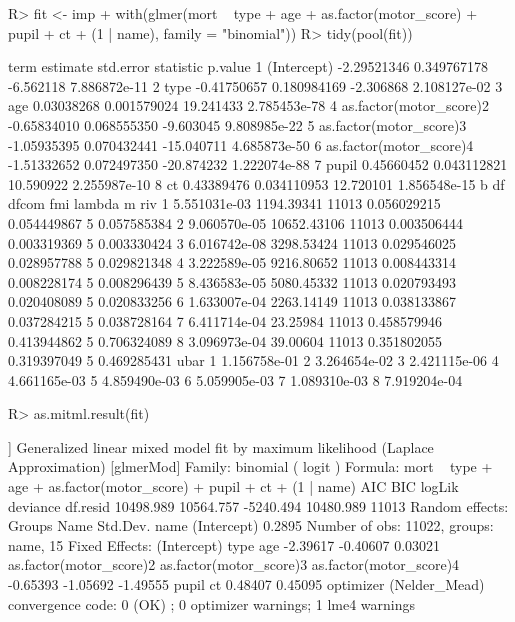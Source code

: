 \documentclass[
]{jss}
\begin{document}
\begin{CodeChunk}
\begin{CodeInput}
R> fit <- imp %
+   with(glmer(mort ~ type + age + as.factor(motor_score) + pupil + ct + (1 | name), family = "binomial")) 
R> tidy(pool(fit))
\end{CodeInput}
\begin{CodeOutput}
                     term    estimate   std.error  statistic      p.value
1             (Intercept) -2.29521346 0.349767178  -6.562118 7.886872e-11
2                    type -0.41750657 0.180984169  -2.306868 2.108127e-02
3                     age  0.03038268 0.001579024  19.241433 2.785453e-78
4 as.factor(motor_score)2 -0.65834010 0.068555350  -9.603045 9.808985e-22
5 as.factor(motor_score)3 -1.05935395 0.070432441 -15.040711 4.685873e-50
6 as.factor(motor_score)4 -1.51332652 0.072497350 -20.874232 1.222074e-88
7                   pupil  0.45660452 0.043112821  10.590922 2.255987e-10
8                      ct  0.43389476 0.034110953  12.720101 1.856548e-15
             b          df dfcom         fmi      lambda m         riv
1 5.551031e-03  1194.39341 11013 0.056029215 0.054449867 5 0.057585384
2 9.060570e-05 10652.43106 11013 0.003506444 0.003319369 5 0.003330424
3 6.016742e-08  3298.53424 11013 0.029546025 0.028957788 5 0.029821348
4 3.222589e-05  9216.80652 11013 0.008443314 0.008228174 5 0.008296439
5 8.436583e-05  5080.45332 11013 0.020793493 0.020408089 5 0.020833256
6 1.633007e-04  2263.14149 11013 0.038133867 0.037284215 5 0.038728164
7 6.411714e-04    23.25984 11013 0.458579946 0.413944862 5 0.706324089
8 3.096973e-04    39.00604 11013 0.351802055 0.319397049 5 0.469285431
          ubar
1 1.156758e-01
2 3.264654e-02
3 2.421115e-06
4 4.661165e-03
5 4.859490e-03
6 5.059905e-03
7 1.089310e-03
8 7.919204e-04
\end{CodeOutput}
\begin{CodeInput}
R> as.mitml.result(fit)
\end{CodeInput}
\begin{CodeOutput}
[[1]]
Generalized linear mixed model fit by maximum likelihood (Laplace
  Approximation) [glmerMod]
 Family: binomial  ( logit )
Formula: mort ~ type + age + as.factor(motor_score) + pupil + ct + (1 |  
    name)
      AIC       BIC    logLik  deviance  df.resid 
10498.989 10564.757 -5240.494 10480.989     11013 
Random effects:
 Groups Name        Std.Dev.
 name   (Intercept) 0.2895  
Number of obs: 11022, groups:  name, 15
Fixed Effects:
            (Intercept)                     type                      age  
               -2.39617                 -0.40607                  0.03021  
as.factor(motor_score)2  as.factor(motor_score)3  as.factor(motor_score)4  
               -0.65393                 -1.05692                 -1.49555  
                  pupil                       ct  
                0.48407                  0.45095  
optimizer (Nelder_Mead) convergence code: 0 (OK) ; 0 optimizer warnings; 1 lme4 warnings 


\end{CodeOutput}
\end{CodeChunk}
\end{document}
